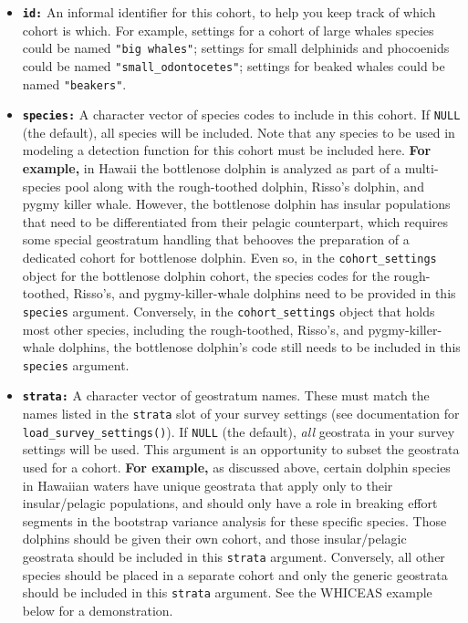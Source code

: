 \documentclass[
]{book}
\begin{document}
\begin{itemize}
\item
  \textbf{\texttt{id:}} An informal identifier for this cohort, to help you keep track of which cohort is which. For example, settings for a cohort of large whales species could be named \texttt{"big\ whales"}; settings for small delphinids and phocoenids could be named \texttt{"small\_odontocetes"}; settings for beaked whales could be named \texttt{"beakers"}.
\item
  \textbf{\texttt{species:}} A character vector of species codes to include in this cohort. If \texttt{NULL} (the default), all species will be included. Note that any species to be used in modeling a detection function for this cohort must be included here. \textbf{For example,} in Hawaii the bottlenose dolphin is analyzed as part of a multi-species pool along with the rough-toothed dolphin, Risso's dolphin, and pygmy killer whale. However, the bottlenose dolphin has insular populations that need to be differentiated from their pelagic counterpart, which requires some special geostratum handling that behooves the preparation of a dedicated cohort for bottlenose dolphin. Even so, in the \texttt{cohort\_settings} object for the bottlenose dolphin cohort, the species codes for the rough-toothed, Risso's, and pygmy-killer-whale dolphins need to be provided in this \texttt{species} argument. Conversely, in the \texttt{cohort\_settings} object that holds most other species, including the rough-toothed, Risso's, and pygmy-killer-whale dolphins, the bottlenose dolphin's code still needs to be included in this \texttt{species} argument.
\item
  \textbf{\texttt{strata:}} A character vector of geostratum names. These must match the names
  listed in the \texttt{strata} slot of your survey settings (see documentation for \texttt{load\_survey\_settings()}). If \texttt{NULL} (the default), \emph{all} geostrata in your survey settings will be used. This argument is an opportunity to subset the geostrata used for a cohort. \textbf{For example,} as discussed above, certain dolphin species in Hawaiian waters have unique geostrata that apply only to their insular/pelagic populations, and should only have a role in breaking effort segments in the bootstrap variance analysis for these specific species. Those dolphins should be given their own cohort, and those insular/pelagic geostrata should be included in this \texttt{strata} argument. Conversely, all other species should be placed in a separate cohort and only the generic geostrata should be included in this \texttt{strata} argument. See the WHICEAS example below for a demonstration.

\end{itemize}
\end{document}
